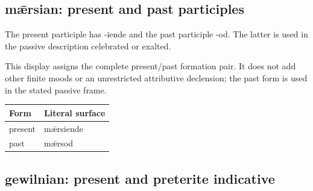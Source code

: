 \par\begin{minipage}{\linewidth}\raggedright
\subsection*{mǣrsian: present and past participles}

The present participle has -iende and the past participle -od. The latter is used in the passive description celebrated or exalted.

This display assigns the complete present/\allowbreak{}past formation pair. It does not add other finite moods or an unrestricted attributive declension; the past form is used in the stated passive frame.

\par\begingroup
\fontsize{10.5}{13.2}\selectfont
\setlength{\LTleft}{0pt}\setlength{\LTright}{\fill}
\noindent
\begin{tabular}{@{}>{\raggedright\arraybackslash}p{55.85mm}>{\raggedright\arraybackslash}p{65.34mm}@{}}
\toprule
\textbf{Form} & \textbf{Literal surface} \\
\midrule
present & mǣrsiende \\
past & mǣrsod \\
\bottomrule
\end{tabular}
\par\endgroup

\end{minipage}\par

\subsection*{gewilnian: present and preterite indicative}

